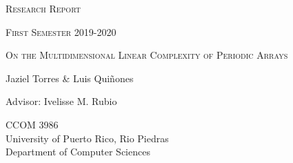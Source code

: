 \documentclass[12pt]{article}
\theoremstyle{definition}
\theoremstyle{definition}
\theoremstyle{definition}
\theoremstyle{plain}
\theoremstyle{plain}
\numberwithin{equation}{section}
\begin{document}
\begin{titlepage}
	\centering
	{\scshape\Large Research Report \par}
	{\scshape\large First Semester 2019-2020 \par}

	\vspace{4cm}
	{\scshape\huge On the Multidimensional Linear Complexity of Periodic Arrays\par}
	\vspace{1.5cm}
	{\large Jaziel Torres \& Luis Quiñones\par}
	\vspace{.3 cm}
	{\large Advisor: Ivelisse M. Rubio\par}
	\vfill
	{CCOM 3986\\
	University of Puerto Rico, Rio Piedras\\
	Department of Computer Sciences\par}
	
\end{titlepage}



\begin{abstract}
    Sequences and multidimensional periodic arrays with entries in finite fields have important applications in coding theory and cryptography. 
    The correlations and the linear complexity of the sequences and multidimensional arrays are important parameters for many applications, especially those related to information security, and hardware implementation. 
    The general goal of this research is to study different constructions of sequences and multidimensional periodic arrays and their correlation and complexity parameters.
    We give a proof for the exact value of the complexity of an array constructed using the composition method that was previously conjectured.
\end{abstract}



\end{document}
